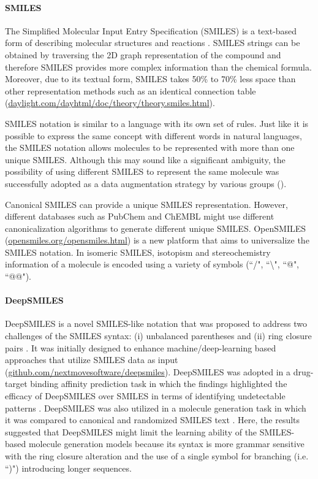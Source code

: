 \documentclass[review]{elsarticle}
\begin{document}
\paragraph{SMILES}
The Simplified Molecular Input Entry Specification (SMILES) is a text-based form of describing molecular structures and reactions \cite{weininger1988smiles}. SMILES strings can be obtained by traversing the  2D graph representation of the compound and therefore SMILES provides more complex information than the chemical formula. Moreover, due to its textual form, SMILES takes 50\% to 70\% less space than other representation methods such as an identical connection table (\url{daylight.com/dayhtml/doc/theory/theory.smiles.html}). 

SMILES notation is similar to a language with its own set of rules. Just like it is possible to express the same concept with different words in natural languages, the SMILES notation allows molecules to be represented with more than one unique SMILES. Although this may sound like a significant ambiguity, the possibility of using different SMILES to represent the same molecule was successfully adopted as a data augmentation strategy by various groups (\citet{bjerrum2017smiles, kimber2018synergy, schwaller2018molecular}).

Canonical SMILES can provide a unique SMILES representation. However, different databases such as PubChem and ChEMBL might use different canonicalization algorithms to generate different unique SMILES. OpenSMILES (\url{opensmiles.org/opensmiles.html}) is a new platform that aims to universalize the SMILES notation. In isomeric SMILES, isotopism and stereochemistry information of a molecule is encoded using a variety of symbols (``/", ``\textbackslash", ``@", ``@@"). 


\paragraph{DeepSMILES} DeepSMILES is a novel SMILES-like notation that was proposed to address two challenges of the SMILES syntax: (i) unbalanced parentheses and (ii) ring closure pairs \cite{OBoyle2018}. It  was initially designed to enhance machine/deep-learning based approaches that utilize SMILES data as input (\url{github.com/nextmovesoftware/deepsmiles}). DeepSMILES was adopted in a drug-target binding affinity prediction task in which the findings highlighted the efficacy of DeepSMILES over SMILES in terms of identifying undetectable patterns \cite{ozturk2018chemical}. DeepSMILES was also utilized in a molecule generation task in which it was compared to canonical and randomized SMILES text \cite{arus2019randomized}. Here, the results suggested that DeepSMILES might limit the learning ability of the SMILES-based molecule generation models because its syntax is more grammar sensitive with the ring closure alteration and the use of a single symbol for branching (i.e. ``)") introducing longer sequences.
\end{document}
